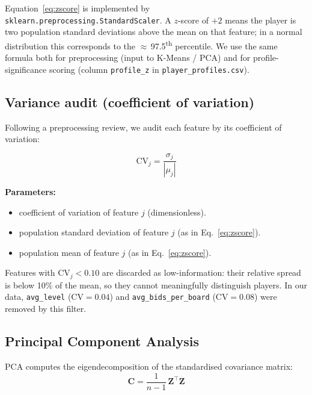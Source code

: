 \documentclass[11pt, a4paper, oneside, openany]{report}
\begin{document}
\noindent Equation~\eqref{eq:zscore} is implemented by \texttt{sklearn.preprocessing.StandardScaler}. A $z$-score of $+2$ means the player is two population standard deviations above the mean on that feature; in a normal distribution this corresponds to the $\approx$\,97.5\textsuperscript{th} percentile. We use the same formula both for preprocessing (input to K-Means / PCA) and for profile-significance scoring (column \texttt{profile\_z} in \texttt{player\_profiles.csv}).

\subsection{Variance audit (coefficient of variation)}

Following a preprocessing review, we audit each feature by its coefficient of variation:

\begin{equation}
\label{eq:cv}
\mathrm{CV}_j = \frac{\sigma_j}{|\mu_j|}
\end{equation}

\noindent\textbf{Parameters:}
\begin{itemize}[leftmargin=2.2cm, itemsep=0pt, topsep=2pt]
    \item[$\mathrm{CV}_j$] coefficient of variation of feature $j$ (dimensionless).
    \item[$\sigma_j$] population standard deviation of feature $j$ (as in Eq.~\eqref{eq:zscore}).
    \item[$\mu_j$] population mean of feature $j$ (as in Eq.~\eqref{eq:zscore}).
\end{itemize}

\noindent Features with $\mathrm{CV}_j < 0.10$ are discarded as low-information: their relative spread is below 10\% of the mean, so they cannot meaningfully distinguish players. In our data, \texttt{avg\_level} ($\mathrm{CV} = 0.04$) and \texttt{avg\_bids\_per\_board} ($\mathrm{CV} = 0.08$) were removed by this filter.

\subsection{Principal Component Analysis}

PCA computes the eigendecomposition of the standardised covariance matrix:
\begin{equation}
\label{eq:pca_cov}
\mathbf{C} = \frac{1}{n-1}\, \mathbf{Z}^\top \mathbf{Z}
\end{equation}
\end{document}
